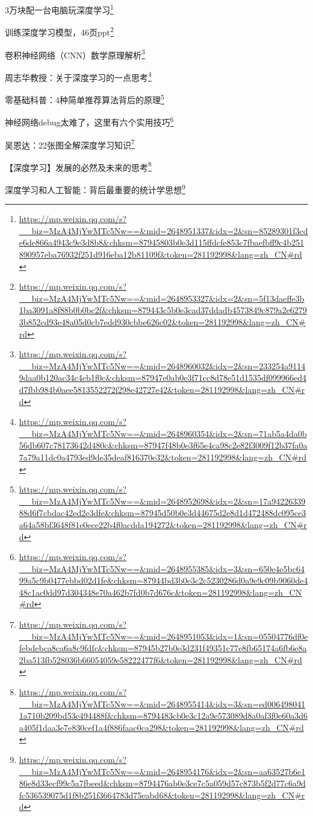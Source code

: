 \documentclass[]{ctexbook}
\renewcommand{\href}[2]{#2\footnote{\url{#1}}}
\begin{document}
\href{https://mp.weixin.qq.com/s?__biz=MzA4MjYwMTc5Nw==\&mid=2648951337\&idx=2\&sn=85289301f3cde6de866a4943c9e3d8b8\&chksm=87945803b0e3d115ffdcfe853c7fbaefbff9c4b251890957eba76932f251d916eba12b81109f\&token=281192998\&lang=zh_CN\#rd}{3万块配一台电脑玩深度学习}

\href{https://mp.weixin.qq.com/s?__biz=MzA4MjYwMTc5Nw==\&mid=2648953327\&idx=2\&sn=5f13daeffe3b1ba3091a8f88b0b0bc2f\&chksm=879443c5b0e3cad37ddadb4573849c879a2e62793b852cd93e48a05d0cb7edd930cbbe626c02\&token=281192998\&lang=zh_CN\#rd}{训练深度学习模型，46页ppt}

\href{https://mp.weixin.qq.com/s?__biz=MzA4MjYwMTc5Nw==\&mid=2648960032\&idx=2\&sn=233254a91149daa0b120ac34c4eb1f0c\&chksm=87947e0ab0e3f71cc8d78e51d1535df099966ed4d7fbb984b0aee5813552272f298e42727e42\&token=281192998\&lang=zh_CN\#rd}{卷积神经网络（CNN）数学原理解析}

\href{https://mp.weixin.qq.com/s?__biz=MzA4MjYwMTc5Nw==\&mid=2648960354\&idx=2\&sn=71ab5a4da0b56db607c78173642d480c\&chksm=87947f48b0e3f65e4ca98c2e82f3009f12b37fa0a7a79a11dc0a4793ed9de35deaf816370e32\&token=281192998\&lang=zh_CN\#rd}{周志华教授：关于深度学习的一点思考}

\href{https://mp.weixin.qq.com/s?__biz=MzA4MjYwMTc5Nw==\&mid=2648952698\&idx=2\&sn=17a9422633988d6f7cbdac42ed2e3dfe\&chksm=87945d50b0e3d44675d2e8d1d472488dc095ce3a64a58bf3648f81e0ece22b4f0acdda194272\&token=281192998\&lang=zh_CN\#rd}{零基础科普：4种简单推荐算法背后的原理}

\href{https://mp.weixin.qq.com/s?__biz=MzA4MjYwMTc5Nw==\&mid=2648955385\&idx=3\&sn=650e4e5bc6499a5c9b0477ebbd02d1fe\&chksm=87944bd3b0e3c2c5230286d0a9e9c09b9060de448c1ac0dd97d304348e70a462b7fd0b7d676c\&token=281192998\&lang=zh_CN\#rd}{神经网络debug太难了，这里有六个实用技巧}

\href{https://mp.weixin.qq.com/s?__biz=MzA4MjYwMTc5Nw==\&mid=2648951053\&idx=1\&sn=05504776df0efebdebca8ca6a8c9fdfc\&chksm=87945b27b0e3d231f49351c77e8fb65174a6fb6e8a2ba513fb528036b66054059e58222477f6\&token=281192998\&lang=zh_CN\#rd}{吴恩达：22张图全解深度学习知识}

\href{https://mp.weixin.qq.com/s?__biz=MzA4MjYwMTc5Nw==\&mid=2648955414\&idx=3\&sn=ed0064980411a710b209bd53e494488f\&chksm=8794483cb0e3c12a9e573089d8a0af3f0e60a3d6a405f1daa3e7e830cef1a4f886faac0ca298\&token=281192998\&lang=zh_CN\#rd}{【深度学习】发展的必然及未来的思考}

\href{https://mp.weixin.qq.com/s?__biz=MzA4MjYwMTc5Nw==\&mid=2648954176\&idx=2\&sn=aa63527b6e186e8d33ecf99c5a7fbeed\&chksm=8794476ab0e3ce7c5a059d57c873b5f2d77c6a9dfc536539075d1f8b251f3664783d75eabd68\&token=281192998\&lang=zh_CN\#rd}{深度学习和人工智能：背后最重要的统计学思想}
\end{document}
